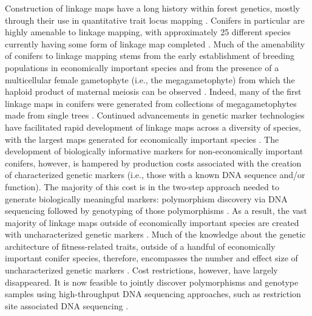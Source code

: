 \documentclass[smallextended]{svjour3}
\begin{document}
Construction of linkage maps have a long history within forest genetics, mostly
through their use in quantitative trait locus mapping
\citep{Ritland:2011}. Conifers in particular are highly amenable to linkage
mapping, with approximately 25 different species currently having some form of
linkage map completed \citep[see Table 5-1 in][]{Ritland:2011}. Much of the
amenability of conifers to linkage mapping stems from the early establishment of
breeding populations in economically important species and from the presence of
a multicellular female gametophyte (i.e., the megagametophyte) from which the
haploid product of maternal meiosis can be observed
\citep{Cairney:2007}. Indeed, many of the first linkage maps in conifers were
generated from collections of megagametophytes made from single trees
\citep{Tulsieram:1992, Nelson:1993, Kubisiak:1996}. Continued advancements in
genetic marker technologies have facilitated rapid development of linkage maps
across a diversity of species, with the largest maps generated for economically
important species \citep[e.g.][] {Achere:2004, Kang:2010, Martinez-Garcia:2013}.
The development of biologically informative markers for non-economically
important conifers, however, is hampered by production costs associated with the
creation of characterized genetic markers (i.e., those with a known DNA
sequence and/or function).  The majority of this cost is in the two-step
approach needed to generate biologically meaningful markers: polymorphism
discovery via DNA sequencing followed by genotyping of those polymorphisms
\citep[cf.,][]{Eckert:2013a}. As a result, the vast majority of linkage maps
outside of economically important species are created with uncharacterized
genetic markers \citep[e.g.,][]{Travis:1998}. Much of the knowledge about the
genetic architecture of fitness-related traits, outside of a handful of
economically important conifer species, therefore, encompasses the number and
effect size of uncharacterized genetic markers \citep{Ritland:2011}. Cost
restrictions, however, have largely disappeared.  It is now feasible to jointly
discover polymorphisms and genotype samples using high-throughput DNA sequencing
approaches, such as restriction site associated DNA sequencing \citep [RADseq;
e.g.,][] {Peterson:2012}.
\end{document}
